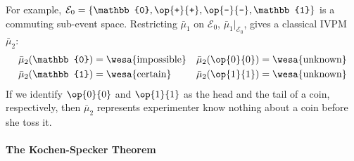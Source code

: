 \documentclass[english,reprint, aps, prl,superscriptaddress, showpacs,
showkeys, longbibliography, amsmath, amssymb]{revtex4-1}
\theoremstyle{plain}
\theoremstyle{definition}
\newcommand{\events}{\ensuremath{\mathcal{E}}}
\newcommand{\imposs}{{\text{\wesa{impossible}}}}
\newcommand{\necess}{{\text{\wesa{certain}}}}
\newcommand{\unknown}{{\text{\wesa{unknown}}}}
\newcommand{\proj}[1]{\op{#1}{#1}}
\newcommand{\ps}{\texttt{+}}
\newcommand{\ms}{\texttt{-}}
\begin{document}
For example, $\events_{0}=\left\{ \mathbb{0},\proj{\ps},\proj{\ms},\mathbb{1}\right\} $
is a commuting sub-event space. Restricting $\bar{\mu}_{1}$ on $\events_{0}$,
$\bar{\mu}_{1}|_{\events_{0}}$, gives a classical IVPM~$\bar{\mu}_{2}$:
\begin{equation}
\begin{aligned}\bar{\mu}_{2}(\mathbb{0}) & =\imposs & \bar{\mu}_{2}(\proj{0}) & =\unknown\\
\bar{\mu}_{2}(\mathbb{1}) & =\necess & \bar{\mu}_{2}(\proj{1}) & =\unknown
\end{aligned}
\end{equation}
If we identify $\proj{0}$ and $\proj{1}$ as the head and the tail
of a coin, respectively, then $\bar{\mu}_{2}$ represents experimenter
know nothing about a coin before she toss it.

\paragraph{The Kochen-Specker Theorem}
\end{document}

